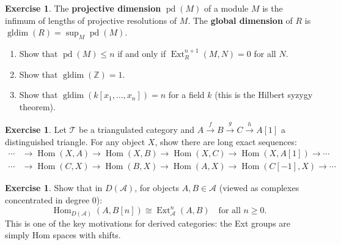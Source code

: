 \documentclass[a4paper,12pt]{book}
\DeclareMathOperator{\Hom}{Hom}
\theoremstyle{definition}
\newtheorem{exercise}[definition]{Exercise}
\theoremstyle{plain}
\theoremstyle{remark}
\begin{document}
\begin{exercise}\label{exo:global-dimension}
The \textbf{projective dimension} $\operatorname{pd}(M)$ of a module $M$ is the infimum of
lengths of projective resolutions of $M$. The \textbf{global dimension} of $R$ is
$\operatorname{gldim}(R) = \sup_M \operatorname{pd}(M)$.
\begin{enumerate}
    \item Show that $\operatorname{pd}(M) \leq n$ if and only if $\operatorname{Ext}^{n+1}_R(M, N) = 0$
    for all $N$.
    \item Show that $\operatorname{gldim}(\mathbb{Z}) = 1$.
    \item Show that $\operatorname{gldim}(k[x_1, \ldots, x_n]) = n$ for a field $k$
    (this is the Hilbert syzygy theorem).
\end{enumerate}
\end{exercise}

\begin{exercise}\label{exo:triangulated-hom}
Let $\mathcal{T}$ be a triangulated category and $A \xrightarrow{f} B \xrightarrow{g} C
\xrightarrow{h} A[1]$ a distinguished triangle. For any object $X$, show there are long
exact sequences:
\begin{align*}
    \cdots &\to \Hom(X, A) \to \Hom(X, B) \to \Hom(X, C) \to \Hom(X, A[1]) \to \cdots \\
    \cdots &\to \Hom(C, X) \to \Hom(B, X) \to \Hom(A, X) \to \Hom(C[-1], X) \to \cdots
\end{align*}
\end{exercise}

\begin{exercise}\label{exo:derived-cat-Hom-Ext}
Show that in $D(\mathcal{A})$, for objects $A, B \in \mathcal{A}$ (viewed as complexes
concentrated in degree 0):
\[
    \Hom_{D(\mathcal{A})}(A, B[n]) \cong \operatorname{Ext}^n_{\mathcal{A}}(A, B)
    \quad \text{for all } n \geq 0.
\]
This is one of the key motivations for derived categories: the Ext groups are simply
Hom spaces with shifts.
\end{exercise}
\end{document}
